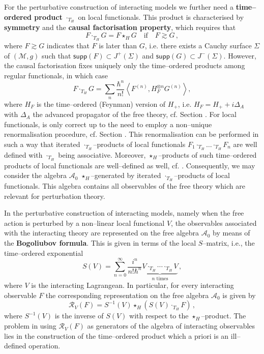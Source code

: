 \documentclass[10pt]{book}
\newcommand{\supp}{\mathsf{supp}}
\newcommand{\Acal}{\mathcal{A}}
\newcommand{\Mcal}{\mathcal{M}}
\theoremstyle{break}
\begin{document}
For the perturbative construction of interacting models we further need a {\bf time--ordered product} $\cdot_{T_H}$ on local functionals. This product is characterised by {\bf symmetry} and the {\bf causal factorisation property}, which requires that 
\begin{equation}
F\cdot_{T_H} G =  F\star_H G\quad    \text{if}\quad F\gtrsim G\,,
\end{equation}
where $F \gtrsim G$ indicates that $F$ is later than $G$, i.e. there exists a Cauchy surface $\Sigma$ of $(\Mcal,g)$ such that $\supp(F) \subset J^+(\Sigma)$ and $\supp(G) \subset J^-(\Sigma)$. However, the causal factorisation fixes uniquely only the time--ordered products among regular functionals, in which case
\begin{equation}
F \cdot_{T_H}  G =  \sum_n \frac{\hbar^n}{n!}\left\langle F^{(n)}, H_F^{\otimes n} G^{(n)} \right\rangle,
\end{equation}
where $H_F$ is the time--ordered (Feynman) version of $H_+$, i.e. $H_F=H_++i\Delta_A$ with $\Delta_A$ the advanced propagator of the free theory, cf. Section %
. For local functionals, %
is only correct up to the need to employ a non--unique renormalisation procedure, cf. Section %
. This renormalisation can be performed in such a way that iterated $\cdot_{T_H}$--products of local functionals $F_1 \cdot_{T_H} \dots \cdot_{T_H} F_n$ are well defined with $\cdot_{T_H}$ being associative. Moreover, $\star_H$--products of such time--ordered products of local functionals are well--defined as well, cf. %
. Consequently, we may consider the algebra $\Acal_0$ $\star_H$--generated by iterated $\cdot_{T_H}$--products of local functionals. This algebra contains all observables of the free theory which are relevant for perturbation theory.

In the perturbative construction of interacting models, namely when the free action is perturbed by a non--linear local functional $V$, the observables associated with the interacting theory are represented on the free algebra $\Acal_0$ by means of the {\bf Bogoliubov formula}. This is given in terms of the local $S$--matrix, i.e., the time--ordered exponential
%
\begin{equation}
S(V)=\sum^\infty_{n=0}\frac{i^n}{n!\hbar^n}\underbrace{V\cdot_{T_H} \cdots \cdot_{T_H} V}_{n \text{ times}}\,,
\end{equation}
%
where $V$ is the interacting Lagrangean.  In particular, for every interacting observable $F$ the corresponding representation on the free algebra $\Acal_0$ is given by
\begin{equation}
\mathcal{R}_V(F) = S^{-1}(V)\star_H \left(  S(V)\cdot_{T_H} F \right)\,, 
\end{equation}
where $S^{-1}(V)$ is the inverse of $S(V)$ with respect to the $\star_H$--product. The problem in using $\mathcal{R}_V(F)$ as generators of the algebra of interacting observables lies in the construction of the time--ordered product which a priori is an ill--defined operation.
\end{document}
